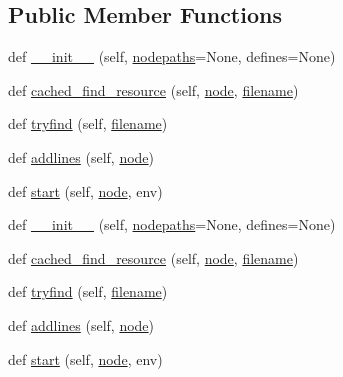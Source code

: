 \subsection*{Public Member Functions}
\begin{DoxyCompactItemize}
\item 
def \hyperlink{classwaflib_1_1_tools_1_1c__preproc_1_1c__parser_aa06a68f192a6f93ba1587fa653d57eaa}{\+\_\+\+\_\+init\+\_\+\+\_\+} (self, \hyperlink{classwaflib_1_1_tools_1_1c__preproc_1_1c__parser_a175b9d997a489166cdfbff084ded4adf}{nodepaths}=None, defines=None)
\item 
def \hyperlink{classwaflib_1_1_tools_1_1c__preproc_1_1c__parser_a05773b7fed7398fc94fb3393dca8b641}{cached\+\_\+find\+\_\+resource} (self, \hyperlink{structnode}{node}, \hyperlink{test__portburn_8cpp_a7efa5e9c7494c7d4586359300221aa5d}{filename})
\item 
def \hyperlink{classwaflib_1_1_tools_1_1c__preproc_1_1c__parser_a7cbdc05f2fac61f5b962f558d18bf7ab}{tryfind} (self, \hyperlink{test__portburn_8cpp_a7efa5e9c7494c7d4586359300221aa5d}{filename})
\item 
def \hyperlink{classwaflib_1_1_tools_1_1c__preproc_1_1c__parser_a9a0cb675b91f0ce6d65109e1b67bcc69}{addlines} (self, \hyperlink{structnode}{node})
\item 
def \hyperlink{classwaflib_1_1_tools_1_1c__preproc_1_1c__parser_ada08ffe0c9d9fcf8d55b3e35927511e6}{start} (self, \hyperlink{structnode}{node}, env)
\item 
def \hyperlink{classwaflib_1_1_tools_1_1c__preproc_1_1c__parser_aa06a68f192a6f93ba1587fa653d57eaa}{\+\_\+\+\_\+init\+\_\+\+\_\+} (self, \hyperlink{classwaflib_1_1_tools_1_1c__preproc_1_1c__parser_a175b9d997a489166cdfbff084ded4adf}{nodepaths}=None, defines=None)
\item 
def \hyperlink{classwaflib_1_1_tools_1_1c__preproc_1_1c__parser_a05773b7fed7398fc94fb3393dca8b641}{cached\+\_\+find\+\_\+resource} (self, \hyperlink{structnode}{node}, \hyperlink{test__portburn_8cpp_a7efa5e9c7494c7d4586359300221aa5d}{filename})
\item 
def \hyperlink{classwaflib_1_1_tools_1_1c__preproc_1_1c__parser_a7cbdc05f2fac61f5b962f558d18bf7ab}{tryfind} (self, \hyperlink{test__portburn_8cpp_a7efa5e9c7494c7d4586359300221aa5d}{filename})
\item 
def \hyperlink{classwaflib_1_1_tools_1_1c__preproc_1_1c__parser_a9a0cb675b91f0ce6d65109e1b67bcc69}{addlines} (self, \hyperlink{structnode}{node})
\item 
def \hyperlink{classwaflib_1_1_tools_1_1c__preproc_1_1c__parser_ada08ffe0c9d9fcf8d55b3e35927511e6}{start} (self, \hyperlink{structnode}{node}, env)

\end{DoxyCompactItemize}
